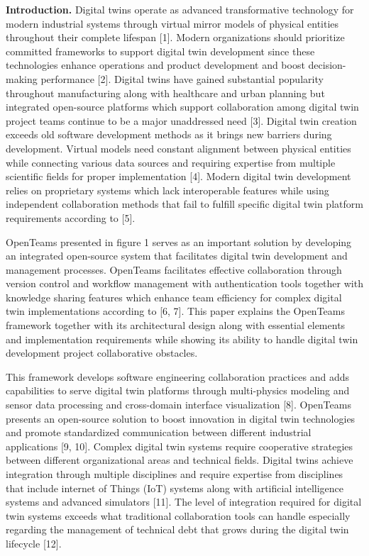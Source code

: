\begin{multicols}{2}
{\bfseries Introduction.} Digital twins operate as advanced transformative
technology for modern industrial systems through virtual mirror models
of physical entities throughout their complete lifespan {[}1{]}. Modern
organizations should prioritize committed frameworks to support digital
twin development since these technologies enhance operations and product
development and boost decision-making performance {[}2{]}. Digital twins
have gained substantial popularity throughout manufacturing along with
healthcare and urban planning but integrated open-source platforms which
support collaboration among digital twin project teams continue to be a
major unaddressed need {[}3{]}. Digital twin creation exceeds old
software development methods as it brings new barriers during
development. Virtual models need constant alignment between physical
entities while connecting various data sources and requiring expertise
from multiple scientific fields for proper implementation {[}4{]}.
Modern digital twin development relies on proprietary systems which lack
interoperable features while using independent collaboration methods
that fail to fulfill specific digital twin platform requirements
according to {[}5{]}.

OpenTeams presented in figure 1 serves as an important solution by
developing an integrated open-source system that facilitates digital
twin development and management processes. OpenTeams facilitates
effective collaboration through version control and workflow management
with authentication tools together with knowledge sharing features which
enhance team efficiency for complex digital twin implementations
according to {[}6, 7{]}. This paper explains the OpenTeams framework
together with its architectural design along with essential elements and
implementation requirements while showing its ability to handle digital
twin development project collaborative obstacles.
\end{multicols}


\begin{multicols}{2}
This framework develops software engineering collaboration practices and
adds capabilities to serve digital twin platforms through multi-physics
modeling and sensor data processing and cross-domain interface
visualization {[}8{]}. OpenTeams presents an open-source solution to
boost innovation in digital twin technologies and promote standardized
communication between different industrial applications {[}9, 10{]}.
Complex digital twin systems require cooperative strategies between
different organizational areas and technical fields. Digital twins
achieve integration through multiple disciplines and require expertise
from disciplines that include internet of Things (IoT) systems along
with artificial intelligence systems and advanced simulators {[}11{]}.
The level of integration required for digital twin systems exceeds what
traditional collaboration tools can handle especially regarding the
management of technical debt that grows during the digital twin
lifecycle {[}12{]}.
\end{multicols}

